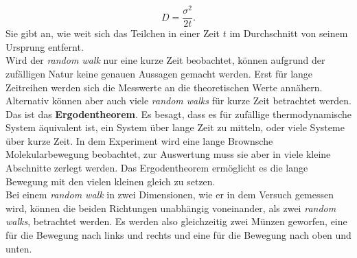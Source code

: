 \begin{equation}
  D = \frac{\sigma^2}{2 t}. \label{eq:diff}
\end{equation}
Sie gibt an, wie weit sich das Teilchen in einer Zeit $t$ im Durchschnitt von seinem Ursprung entfernt.\\

Wird der \emph{random walk} nur eine kurze Zeit beobachtet, können aufgrund der zufälligen Natur keine genauen Aussagen gemacht werden. Erst für lange Zeitreihen werden sich die Messwerte an die theoretischen Werte annähern. Alternativ können aber auch viele \emph{random walks} für kurze Zeit betrachtet werden. Das ist das \textbf{Ergodentheorem}. Es besagt, dass es für zufällige thermodynamische System äquivalent ist, ein System über lange Zeit zu mitteln, oder viele Systeme über kurze Zeit. In dem Experiment wird eine lange Brownsche Molekularbewegung beobachtet, zur Auswertung muss sie aber in viele kleine Abschnitte zerlegt werden. Das Ergodentheorem ermöglicht es die lange Bewegung mit den vielen kleinen gleich zu setzen.\\
Bei einem \emph{random walk} in zwei Dimensionen, wie er in dem Versuch gemessen wird, können die beiden Richtungen unabhängig voneinander, als zwei \emph{random walks}, betrachtet werden. Es werden also gleichzeitig zwei Münzen geworfen, eine für die Bewegung nach links und rechts und eine für die Bewegung nach oben und unten.\\


